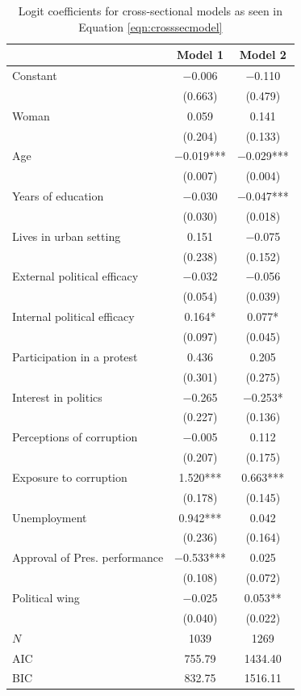 \documentclass[12pt,a4]{article}\usepackage[]{graphicx}\usepackage[]{xcolor}
\begin{document}
\begin{table}[htbp]
\begin{center}
\caption{Logit coefficients for cross-sectional models as seen in Equation \ref{eqn:crosssecmodel}}
\label{tab:crossmod}

\begin{tabular}[t]{lcc}
\toprule
  & Model 1 & Model 2\\
\midrule
Constant & \num{-0.006} & \num{-0.110}\\
 & (\num{0.663}) & (\num{0.479})\\
Woman & \num{0.059} & \num{0.141}\\
 & (\num{0.204}) & (\num{0.133})\\
Age & \num{-0.019}*** & \num{-0.029}***\\
 & (\num{0.007}) & (\num{0.004})\\
Years of education & \num{-0.030} & \num{-0.047}***\\
 & (\num{0.030}) & (\num{0.018})\\
Lives in urban setting & \num{0.151} & \num{-0.075}\\
 & (\num{0.238}) & (\num{0.152})\\
External political efficacy & \num{-0.032} & \num{-0.056}\\
 & (\num{0.054}) & (\num{0.039})\\
Internal political efficacy & \num{0.164}* & \num{0.077}*\\
 & (\num{0.097}) & (\num{0.045})\\
Participation in a protest & \num{0.436} & \num{0.205}\\
 & (\num{0.301}) & (\num{0.275})\\
Interest in politics & \num{-0.265} & \num{-0.253}*\\
 & (\num{0.227}) & (\num{0.136})\\
Perceptions of corruption & \num{-0.005} & \num{0.112}\\
 & (\num{0.207}) & (\num{0.175})\\
Exposure to corruption & \num{1.520}*** & \num{0.663}***\\
 & (\num{0.178}) & (\num{0.145})\\
Unemployment & \num{0.942}*** & \num{0.042}\\
 & (\num{0.236}) & (\num{0.164})\\
Approval of Pres. performance & \num{-0.533}*** & \num{0.025}\\
 & (\num{0.108}) & (\num{0.072})\\
Political wing & \num{-0.025} & \num{0.053}**\\
 & (\num{0.040}) & (\num{0.022})\\
\midrule
$N$ & \num{1039} & \num{1269}\\
AIC & \num{755.79} & \num{1434.40}\\
BIC & \num{832.75} & \num{1516.11}\\
\bottomrule
\end{tabular}



\end{center}
\end{table}
\end{document}
